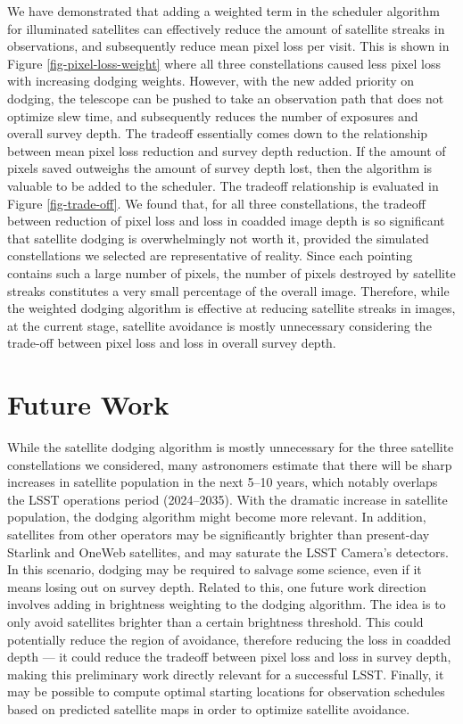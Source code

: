 \documentclass[linenumbers]{aastex631}
\begin{document}
We have demonstrated that adding a weighted term in the scheduler algorithm for
illuminated satellites can effectively reduce the amount of satellite streaks in observations, and
subsequently reduce mean pixel loss per visit. This is shown in Figure \ref{fig-pixel-loss-weight} where all three
constellations caused less pixel loss with increasing dodging weights. However, with the new
added priority on dodging, the telescope can be pushed to take an observation path that does not
optimize slew time, and subsequently reduces the number of exposures and overall survey depth.
The tradeoff essentially comes down to the relationship between mean pixel loss
reduction and survey depth reduction. If the amount of pixels saved outweighs the amount of
survey depth lost, then the algorithm is valuable to be added to the scheduler. The tradeoff
relationship is evaluated in Figure \ref{fig-trade-off}. We found that, for all three constellations, the tradeoff
between reduction of pixel loss and loss in coadded image depth is so significant that satellite
dodging is overwhelmingly not worth it, provided the simulated constellations we selected are
representative of reality. Since each pointing contains such a large number of pixels, the number
of pixels destroyed by satellite streaks constitutes a very small percentage of the overall image.
Therefore, while the weighted dodging algorithm is effective at reducing satellite streaks in
images, at the current stage, satellite avoidance is mostly unnecessary considering the trade-off
between pixel loss and loss in overall survey depth.

\section{Future Work}
While the satellite dodging algorithm is mostly unnecessary for the three satellite
constellations we considered, many astronomers estimate that there will be sharp increases in
satellite population in the next 5–10 years, which notably overlaps the LSST operations period
(2024–2035). With the dramatic increase in satellite population, the dodging algorithm might
become more relevant. In addition, satellites from other operators may be significantly brighter
than present-day Starlink and OneWeb satellites, and may saturate the LSST Camera’s detectors.
In this scenario, dodging may be required to salvage some science, even if it means losing out on
survey depth.
Related to this, one future work direction involves adding in brightness weighting to the
dodging algorithm. The idea is to only avoid satellites brighter than a certain brightness
threshold. This could potentially reduce the region of avoidance, therefore reducing the loss in
coadded depth — it could reduce the tradeoff between pixel loss and loss in survey depth,
making this preliminary work directly relevant for a successful LSST. Finally, it may be possible
to compute optimal starting locations for observation schedules based on predicted satellite maps
in order to optimize satellite avoidance.
\end{document}
